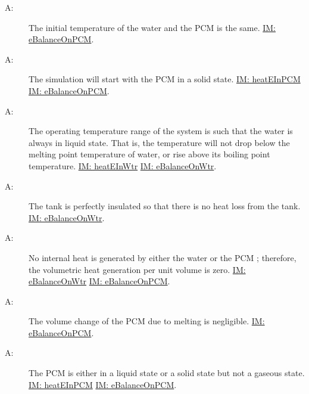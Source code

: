 \documentclass[12pt]{article}
\newcounter{assumpnum}
\newcommand{\atheassumpnum}{A\theassumpnum}
\begin{document}
\begin{description}
\item[\atheassumpnum\label{A:Same-Initial-Temp-Water-PCM}:]The initial temperature of the water and the PCM is the same. \hyperref[IM:eBalanceOnPCM]{IM: eBalanceOnPCM}.
\end{description}
\begin{description}
\item[\atheassumpnum\label{A:PCM-Initially-Solid}:]The simulation will start with the PCM in a solid state. \hyperref[IM:heatEInPCM]{IM: heatEInPCM} \hyperref[IM:eBalanceOnPCM]{IM: eBalanceOnPCM}.
\end{description}
\begin{description}
\item[\atheassumpnum\label{A:Water-Always-Liquid}:]The operating temperature range of the system is such that the water is always in liquid state. That is, the temperature will not drop below the melting point temperature of water, or rise above its boiling point temperature. \hyperref[IM:heatEInWtr]{IM: heatEInWtr} \hyperref[IM:eBalanceOnWtr]{IM: eBalanceOnWtr}.
\end{description}
\begin{description}
\item[\atheassumpnum\label{A:Perfect-Insulation-Tank}:]The tank is perfectly insulated so that there is no heat loss from the tank. \hyperref[IM:eBalanceOnWtr]{IM: eBalanceOnWtr}.
\end{description}
\begin{description}
\item[\atheassumpnum\label{A:No-Internal-Heat-Generation-By-Water-PCM}:]No internal heat is generated by either the water or the PCM ; therefore, the volumetric heat generation per unit volume is zero. \hyperref[IM:eBalanceOnWtr]{IM: eBalanceOnWtr} \hyperref[IM:eBalanceOnPCM]{IM: eBalanceOnPCM}.
\end{description}
\begin{description}
\item[\atheassumpnum\label{A:Volume-Change-Melting-PCM-Negligible}:]The volume change of the PCM due to melting is negligible. \hyperref[IM:eBalanceOnPCM]{IM: eBalanceOnPCM}.
\end{description}
\begin{description}
\item[\atheassumpnum\label{A:No-Gaseous-State-PCM}:]The PCM is either in a liquid state or a solid state but not a gaseous state. \hyperref[IM:heatEInPCM]{IM: heatEInPCM} \hyperref[IM:eBalanceOnPCM]{IM: eBalanceOnPCM}.
\end{description}
\end{document}
